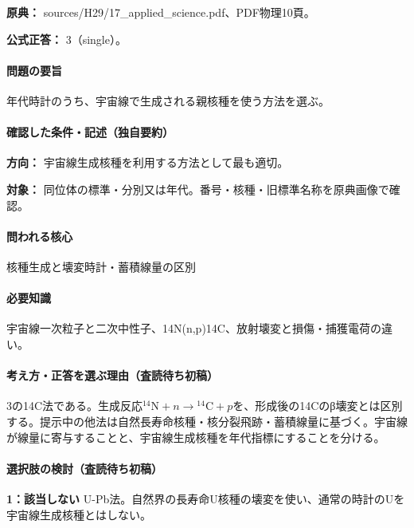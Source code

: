 \noindent\textbf{原典：} sources/H29/17\_applied\_science.pdf、PDF物理10頁。

\textbf{公式正答：} 3（single）。

\paragraph{問題の要旨} 年代時計のうち、宇宙線で生成される親核種を使う方法を選ぶ。

\paragraph{確認した条件・記述（独自要約）}\mbox{}\par

\noindent\textbf{方向：} 宇宙線生成核種を利用する方法として最も適切。\par

\noindent\textbf{対象：} 同位体の標準・分別又は年代。番号・核種・旧標準名称を原典画像で確認。\par

\paragraph{問われる核心} 核種生成と壊変時計・蓄積線量の区別

\paragraph{必要知識} 宇宙線一次粒子と二次中性子、14N(n,p)14C、放射壊変と損傷・捕獲電荷の違い。

\paragraph{考え方・正答を選ぶ理由（査読待ち初稿）} 3の14C法である。生成反応\({}^{14}\mathrm N+n\to{}^{14}\mathrm C+p\)を、形成後の14Cのβ壊変とは区別する。提示中の他法は自然長寿命核種・核分裂飛跡・蓄積線量に基づく。宇宙線が線量に寄与することと、宇宙線生成核種を年代指標にすることを分ける。

\paragraph{選択肢の検討（査読待ち初稿）}\mbox{}\par

\noindent\textbf{1：該当しない} U-Pb法。自然界の長寿命U核種の壊変を使い、通常の時計のUを宇宙線生成核種とはしない。\par

